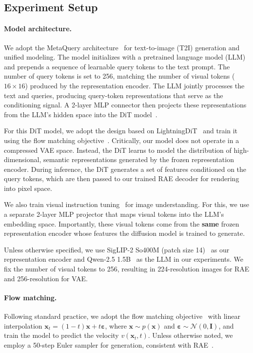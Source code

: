 \documentclass[10pt,twocolumn,letterpaper]{article}
\begin{document}
\subsection{Experiment Setup}\label{sec: rae experiment setup}

\paragraph{Model architecture.}
We adopt the MetaQuery architecture~\citep{metaquery} for text-to-image (T2I) generation and unified modeling. The model initializes with a pretrained language model (LLM) and prepends a sequence of learnable query tokens to the text prompt. The number of query tokens is set to 256, matching the number of visual tokens ($16 \times 16$) produced by the representation encoder. The LLM jointly processes the text and queries, producing query-token representations that serve as the conditioning signal. 
A 2-layer MLP connector then projects these representations from the LLM’s hidden space into the DiT model~\citep{dit}.


For this DiT model, we adopt the design based on LightningDiT~\citep{lgt} and train it using the flow matching objective~\citep{fm}. Critically, our model does not operate in a compressed VAE space. Instead, the DiT learns to model the distribution of high-dimensional, semantic representations generated by the frozen representation encoder. During inference, the DiT generates a set of features conditioned on the query tokens, which are then passed to our trained RAE decoder for rendering into pixel space. 

We also train visual instruction tuning~\citep{liu2023improved, liu2023visual} for image understanding. For this, we use a separate 2-layer MLP projector that maps visual tokens into the LLM’s embedding space. Importantly, these visual tokens come from the \textbf{same} frozen representation encoder whose features the diffusion model is trained to generate.


Unless otherwise specified, we use  SigLIP-2 So400M (patch size 14)~\citep{tschannen2025siglip} as our representation encoder and Qwen-2.5 1.5B~\citep{qwen2024qwen2} as the LLM in our experiments. We fix the number of visual tokens to 256, resulting in 224-resolution images for RAE and 256-resolution for VAE. 


\paragraph{Flow matching.} Following standard practice, we adopt the flow matching objective~\citep{fm, rf} with linear interpolation $\mathbf{x}_t = (1 - t)\mathbf{x} + t \mathbf{\varepsilon}$, where $\mathbf{x} \sim p(\mathbf{x})$ and $\mathbf{\varepsilon} \sim \mathcal{N}(0, \mathbf{I})$, and train the model to predict the velocity $v(\mathbf{x}_t, t)$. Unless otherwise noted, we employ a 50-step Euler sampler for generation, consistent with RAE~\citep{zheng2025diffusion}.
\end{document}
